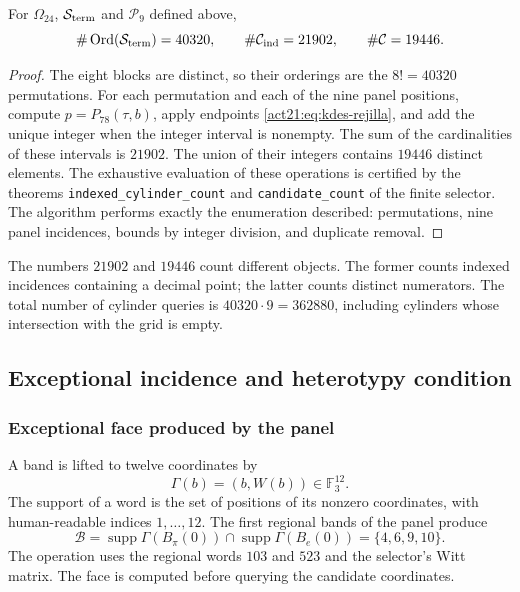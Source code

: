 \begin{proposition}
For $\Omega_{24}$, $\mathcal S_{\rm term}$ and $\mathcal P_9$
defined above,
\[
 \#\operatorname{Ord}(\mathcal S_{\rm term})=40320,
 \qquad\#\mathcal C_{\rm ind}=21902,
 \qquad\#\mathcal C=19446.
\]
\end{proposition}
\begin{proof}
The eight blocks are distinct, so their orderings are the
$8!=40320$ permutations. For each permutation and each of the
nine panel positions, compute $p=P_{78}(\tau,b)$, apply
endpoints \eqref{act21:eq:kdes-rejilla}, and add the unique integer when
the integer interval is nonempty. The sum of the cardinalities of these
intervals is $21902$. The union of their integers contains $19446$
distinct elements. The exhaustive evaluation of these operations
is certified by the theorems
\texttt{indexed\_cylinder\_count} and \texttt{candidate\_count} of the
finite selector. The algorithm performs exactly the enumeration
described: permutations, nine panel incidences, bounds by
integer division, and duplicate removal.
\end{proof}

The numbers $21902$ and $19446$ count different objects. The former
counts indexed incidences containing a decimal point; the latter
counts distinct numerators. The total number of cylinder queries
is $40320\cdot9=362880$, including cylinders whose intersection with
the grid is empty.

\subsection{Exceptional incidence and heterotypy condition}

\subsubsection{Exceptional face produced by the panel}

A band is lifted to twelve coordinates by
\[
 \Gamma(b)=(b,W(b))\in\mathbb F_3^{12}.
\]
The support of a word is the set of positions of its
nonzero coordinates, with human-readable indices $1,\ldots,12$. The first
regional bands of the panel produce
\begin{equation}
 \mathcal B=\operatorname{supp}\Gamma(B_\pi(0))
          \cap\operatorname{supp}\Gamma(B_e(0))
          =\{4,6,9,10\}.
 \label{act21:eq:kdes-cara}
\end{equation}
The operation uses the regional words $103$ and $523$ and the
selector's Witt matrix. The face is computed before querying the
candidate coordinates.

